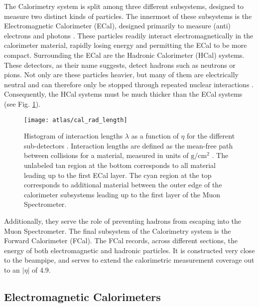     The Calorimetry system is split among three different subsystems, designed to measure two distinct kinds of particles.
    The innermost of these subsystems is the Electromagnetic Calorimeter (ECal), designed primarily to measure (anti) electrons and photons \cite{calorimetry_lecture}.
    These particles readily interact electromagnetically in the calorimeter material, rapidly losing energy and permitting the ECal to be more compact.
    Surrounding the ECal are the Hadronic Calorimeter (HCal) systems.
    These detectors, as their name suggests, detect hadrons such as neutrons or pions.
    Not only are these particles heavier, but many of them are electrically neutral and can therefore only be stopped through repeated nuclear interactions \cite{energy_measurement}.
    Consequently, the HCal systems must be much thicker than the ECal systems (see Fig. \ref{fig:cal_rad_length}).
    \begin{figure} \centering
        \texttt{[image: atlas/cal\_rad\_length]}
        \caption{
            Histogram of interaction lengths $\lambda$ as a function of $\eta$ for the different sub-detectors \cite{atlas_tdr}.
            Interaction lengths are defined as the mean-free path between collisions for a material,
                measured in units of $\textrm{g}/\textrm{cm}^2$ \cite{pdg}.
            The unlabeled tan region at the bottom corresponds to all material leading up to the first ECal layer.
            The cyan region at the top corresponds to additional material between the outer edge of the calorimeter subsystems
                leading up to the first layer of the Muon Spectrometer.
        }
        \label{fig:cal_rad_length}
    \end{figure}
    Additionally, they serve the role of preventing hadrons from escaping into the Muon Spectrometer.
    The final subsystem of the Calorimetry system is the Forward Calorimeter (FCal).
    The FCal records, across different sections, the energy of both electromagnetic and hadronic particles.
    It is constructed very close to the beampipe, and serves to extend the calorimetric measurement coverage out to an $|\eta|$ of 4.9.

    \pagebreak
    \subsection{Electromagnetic Calorimeters}

